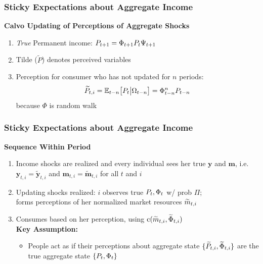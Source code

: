 \documentclass[10pt,english,t,10pt]{beamer}
\newcommand{\jemph}[1]{{\color{StataDarkBlue}#1}}
\newcommand{\jbemph}[1]{\textbf{\color{SlideNavy}#1}}
\providecommand{\perc}[1]{\widetilde{#1}}
\providecommand{\jemph}[1]{{\color{jirkasblue}#1}}
\begin{document}
\begin{frame}
\frametitle{Sticky Expectations about Aggregate Income}

\jbemph{\large Calvo Updating of Perceptions of Aggregate Shocks}\\
\begin{enumerate}
\item {\it True} Permanent income: ${P}_{t+1} =  \Phi_{t+1} {P}_{t}\Psi_{t+1}$\\
\item Tilde ($\perc{P}$) denotes perceived variables
\item \jemph{Perception for consumer who has not updated for $n$ periods:}
$$
  \perc{P}_{t,i}=\Ex_{t-n}\big[P_t\big\vert\Omega_{t-n}\big]=\Phi_{t-n}^nP_{t-n}
$$
because $\Phi$ is random walk 
\end{enumerate}
\end{frame}



\begin{frame}
\frametitle{Sticky Expectations about Aggregate Income}

\jbemph{\large Sequence Within Period}\\
\begin{enumerate}
\setlength{\itemsep}{2mm}
\item Income shocks are realized and every individual sees her true $\mathbf{y}$ and $\mathbf{m}$,
i.e.\ $\mathbf{y}_{t,i}=\perc{\mathbf{y}}_{t,i}$ and $\mathbf{m}_{t,i}=\perc{\mathbf{m}}_{t,i}$ for all $t$ and $i$

\pause
\item Updating shocks realized: $i$ observes true $P_t, \Phi_t$ w/ prob $\Pi$;\\
forms perceptions of her normalized market resources $\perc{\mLev}_{t,i}$

\pause
\item Consumes based on her perception, \jemph{using $\cFunc(\perc{m}_{t,i},\perc{\PtyGro}_{t,i})$}\\[1mm]
\vfill \vfill 
  \jemph{\textbf{Key Assumption:}}\\
    \begin{itemize}
    \item  People act as if their perceptions about aggregate state $\{\perc{P}_{t,i},\perc{\PtyGro}_{t,i}\}$
are the true aggregate state $\{P_t,\Phi_t\}$
    \end{itemize}

\end{enumerate}

\end{frame}
\end{document}
